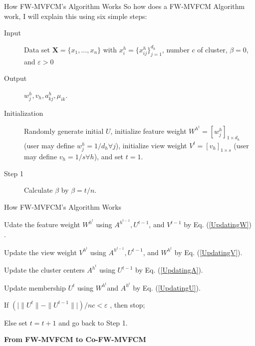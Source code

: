 \documentclass[compress,sky blue]{beamer}
\begin{document}
\begin{frame}{How FW-MVFCM's Algorithm Works}
	\vspace{-0.3cm}	
So how does a FW-MVFCM Algorithm work, I will explain this using six simple steps:
\begin{description}
\item [Input]
Data set $\boldsymbol{X}=\{ x_{1},. . .,x_{n} \}$ with $x_{i}^{h}=\{ x_{ij}^{h} \}_{j=1}^{d_{h}}$, number $c$ of cluster, $\beta=0$, and $\varepsilon>0$
\item[Output]
$w_{j}^{h}, v_{h}, a_{kj}^{h}, \mu_{ik}.$
\item[Initialization]
Randomly generate initial $U$, initialize feature weight $W^{h^{t}}=[w_{j}^{h}]_{1\times d_{h}}$ (user may define $w_{j}^{h}=1/d_{h}\forall j$), initialize view weight $V^{t}=[v_{h}]_{1\times s}$ (user may define $v_{h}=1/s\forall h$), and set $t=1.$
\item[Step 1]
Calculate $\beta$  by $\beta=t/n.$
\end{description}
\end{frame}

\begin{frame}{How FW-MVFCM's Algorithm Works}
	\vspace{-0.3cm}	
\begin{description}
\item[Step 2]
Udate the feature weight $W^{h^{t}}$ using $A^{h^{t-1}}, U^{t-1}$, and $V^{t-1}$ by Eq. (\ref{UpdatingW}) .
\item[Step 3]
Update the view weight $V^{h^{t}}$ using $A^{h^{t-1}}, U^{t-1}$, and $W^{h^{t}}$ by Eq. (\ref{UpdatingV}).
\item[Step 4]
Update the cluster centers  $A^{h^{t}}$ using $ U^{t-1}$ by Eq. (\ref{UpdatingA}).
\item[Step 5]
Update membership  $U^{t}$ using $W^{h^{t}}$and $A^{h^{t}}$  by Eq. (\ref{UpdatingU}).
\item[Step 6]
If  $\left(\Big|\|U^{t}\|-\|U^{t-1}\|\Big|\right)\Big/nc<\varepsilon$ , then stop;
\item 
Else set $t=t+1$  and go back to Step 1.
\end{description}
\end{frame}


\begin{frame}{}
    \centering
    \Huge{\textbf{From FW-MVFCM to Co-FW-MVFCM}}
\end{frame}
\end{document}
